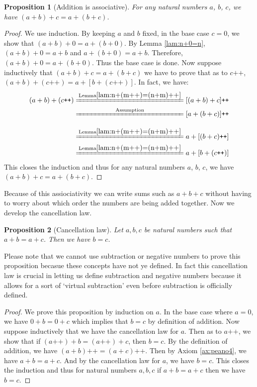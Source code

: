 \documentclass[a4paper,oneside]{book}
\newtheorem*{proof}{\textit{Proof.}}
\newtheorem{proposition}{Proposition}[section]
\begin{document}
			\begin{proposition}[Addition is associative]
				For any natural numbers $a$, $b$, $c$, we have $(a+b)+c=a+(b+c)$.
			\end{proposition}
			\begin{proof}
				We use induction. By keeping $a$ and $b$ fixed, in the base case $c=0$, we show that $(a+b)+0=a+(b+0)$. By Lemma \ref{lam:n+0=n}, $(a+b)+0=a+b$ and $a+(b+0)=a+b$. Therefore, $(a+b)+0=a+(b+0)$. Thus the base case is done. Now suppose inductively that $(a+b)+c=a+(b+c)$ we have to prove that as to $c\texttt{++}$, $(a+b)+(c\texttt{++})=a+[b+(c\texttt{++})]$. In fact, we have:
				\begin{align*}
					(a+b)+(c\texttt{++})&\xlongequal{\mathrm{Lemma \ref{lam:n+(m++)=(n+m)++}}}[(a+b)+c]\texttt{++}\\
					&\xlongequal[\phantom{\mathrm{Lemma \ref{lam:n+(m++)=(n+m)++}}}]{\mathrm{Assumption}}[a+(b+c)]\texttt{++}\\
					&\xlongequal{\mathrm{Lemma \ref{lam:n+(m++)=(n+m)++}}}a+[(b+c)\texttt{++}]\\
					&\xlongequal{\mathrm{Lemma \ref{lam:n+(m++)=(n+m)++}}}a+[b+(c\texttt{++})]
				\end{align*}
				This closes the induction and thus for any natural numbers $a$, $b$, $c$, we have $(a+b)+c=a+(b+c)$.
			\end{proof}
			Because of this assiociativity we can write sums such as $a+b+c$ without having to worry about which order the numbers are being added together.
			Now we develop the cancellation law.
			\begin{proposition}[Cancellation law]
				Let $a,b,c$ be natural numbers such that $a+b=a+c$. Then we have $b=c$.
			\end{proposition}
			Please note that we cannot use subtraction or negative numbers to prove this proposition becasue these concepts have not ye defined. In fact this cancellation law is crucial in letting us define subtraction and negative numbers because it allows for a sort of `virtual subtraction' even before subtraction is officially defined.
			\begin{proof}
				We prove this proposition by induction on $a$. In the base case where $a=0$, we have $0+b=0+c$ which implies that $b=c$ by definition of addition. Now suppose inductively that we have the cancellation law for $a$. Then as to $a\texttt{++}$, we show that if $(a\texttt{++})+b=(a\texttt{++})+c$, then $b=c$. By the definition of addition, we have $(a+b)\texttt{++}=(a+c)\texttt{++}$. Then by Axiom \ref{ax:peano4}, we have $a+b=a+c$. And by the cancellation law for $a$, we have $b=c$. This closes the induction and thus for natural numbers $a,b,c$ if $a+b=a+c$ then we have $b=c$.
			\end{proof}
\end{document}
